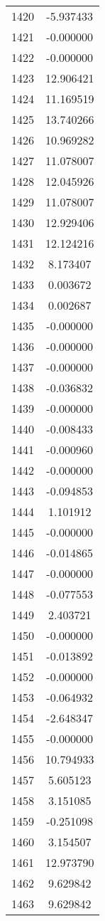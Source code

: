 \documentclass[12pt]{article}
\begin{document}
\begin{longtable}{@{}cc@{}}
1420 & -5.937433 \\
1421 & -0.000000 \\
1422 & -0.000000 \\
1423 & 12.906421 \\
1424 & 11.169519 \\
1425 & 13.740266 \\
1426 & 10.969282 \\
1427 & 11.078007 \\
1428 & 12.045926 \\
1429 & 11.078007 \\
1430 & 12.929406 \\
1431 & 12.124216 \\
1432 & 8.173407 \\
1433 & 0.003672 \\
1434 & 0.002687 \\
1435 & -0.000000 \\
1436 & -0.000000 \\
1437 & -0.000000 \\
1438 & -0.036832 \\
1439 & -0.000000 \\
1440 & -0.008433 \\
1441 & -0.000960 \\
1442 & -0.000000 \\
1443 & -0.094853 \\
1444 & 1.101912 \\
1445 & -0.000000 \\
1446 & -0.014865 \\
1447 & -0.000000 \\
1448 & -0.077553 \\
1449 & 2.403721 \\
1450 & -0.000000 \\
1451 & -0.013892 \\
1452 & -0.000000 \\
1453 & -0.064932 \\
1454 & -2.648347 \\
1455 & -0.000000 \\
1456 & 10.794933 \\
1457 & 5.605123 \\
1458 & 3.151085 \\
1459 & -0.251098 \\
1460 & 3.154507 \\
1461 & 12.973790 \\
1462 & 9.629842 \\
1463 & 9.629842 \\

\end{longtable}
\end{document}
